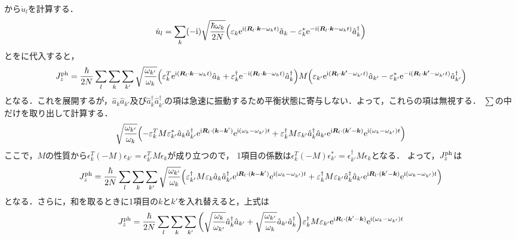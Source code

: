 \documentclass{report}
\begin{document}
から$\dot{u}_l$を計算する．
\begin{align}
  \dot{u}_l = \sum_{k} (-\mathrm{i})\sqrt{\frac{\hbar\omega_k}{2N}}\qty(\varepsilon_k \mathrm{e}^{\mathrm{i}(\bm{R}_l\cdot\bm{k} - \omega_k t)}\hat{a}_k - \varepsilon_k^* \mathrm{e}^{-\mathrm{i}(\bm{R}_l\cdot\bm{k} - \omega_k t)}\hat{a}_k^\dagger) \label{phonon-dot}
\end{align}
とをに代入すると，
\begin{align}
  J_z^{\mathrm{ph}} &= \frac{\hbar}{2N} \sum_{l} \sum_{k}\sum_{k'} \sqrt{\frac{\omega_{k'}}{\omega_k}} \qty(\varepsilon_k^T \mathrm{e}^{\mathrm{i}(\bm{R}_l\cdot\bm{k} - \omega_k t)}\hat{a}_k + \varepsilon_k^{\dagger} \mathrm{e}^{-\mathrm{i}(\bm{R}_l\cdot\bm{k} - \omega_k t)}\hat{a}_k^\dagger) M
  \qty(\varepsilon_{k'} \mathrm{e}^{\mathrm{i}(\bm{R}_l\cdot\bm{k'} - \omega_{k'} t)}\hat{a}_{k'} - \varepsilon_{k'}^{*} \mathrm{e}^{-\mathrm{i}(\bm{R}_l\cdot\bm{k'} - \omega_{k'} t)}\hat{a}_{k'}^\dagger)\\
\end{align}
となる．これを展開するが，$\hat{a}_k\hat{a}_{k'}$及び$\hat{a}_k^\dagger\hat{a}_{k'}^\dagger$の項は急速に振動するため平衡状態に寄与しない．よって，これらの項は無視する．
$\sum$の中だけを取り出して計算する．
\begin{align}
  \sqrt{\frac{\omega_{k'}}{\omega_k}} \qty(-\varepsilon_k^T M \varepsilon_{k'}^{*} \hat{a}_k\hat{a}_{k'}^{\dagger} \mathrm{e}^{\mathrm{i}\bm{R}_l\cdot(\bm{k}- \bm{k}')}\mathrm{e}^{\mathrm{i}(\omega_k - \omega_{k'})t} + \varepsilon_k^\dagger M \varepsilon_{k'} \hat{a}_k^\dagger\hat{a}_{k'} \mathrm{e}^{\mathrm{i}\bm{R}_l\cdot(\bm{k}'- \bm{k})}\mathrm{e}^{\mathrm{i}(\omega_k - \omega_{k'})t})
\end{align}
ここで，$M$の性質から$\epsilon_k^T (-M) \epsilon_{k'} = \epsilon_{k'}^{T}M\epsilon_k$が成り立つので，
1項目の係数は$\epsilon_k^T (-M) \epsilon_{k'}^{*} = \epsilon_{k'}^{\dagger}M\epsilon_k$となる．
よって，$J_z^{\mathrm{ph}}$は
\begin{align}
  J_z^{\mathrm{ph}} = \frac{\hbar}{2N} \sum_{l} \sum_{k}\sum_{k'} \sqrt{\frac{\omega_{k'}}{\omega_k}} \qty(\varepsilon_{k'}^{\dagger}M\varepsilon_k \hat{a}_k\hat{a}_{k'}^{\dagger} \mathrm{e}^{\mathrm{i}\bm{R}_l\cdot(\bm{k}- \bm{k}')}\mathrm{e}^{\mathrm{i}(\omega_k - \omega_{k'})t} + \varepsilon_k^\dagger M \varepsilon_{k'} \hat{a}_k^\dagger\hat{a}_{k'} \mathrm{e}^{\mathrm{i}\bm{R}_l\cdot(\bm{k}'- \bm{k})}\mathrm{e}^{\mathrm{i}(\omega_k - \omega_{k'})t})
\end{align}
となる．さらに，和を取るときに1項目の$k$と$k'$を入れ替えると，上式は
\begin{align}
  J_z^{\mathrm{ph}} = \frac{\hbar}{2N} \sum_{l} \sum_{k}\sum_{k'} \qty(\sqrt{\frac{\omega_k}{\omega_{k'}}} \hat{a}_k^\dagger\hat{a}_{k'} + \sqrt{\frac{\omega_{k'}}{\omega_k}}\hat{a}_{k'}\hat{a}_k^\dagger) \varepsilon_k^\dagger M \varepsilon_{k'} \mathrm{e}^{\mathrm{i}\bm{R}_l\cdot(\bm{k}'- \bm{k})}\mathrm{e}^{\mathrm{i}(\omega_k - \omega_{k'})t}
\end{align}
\end{document}
